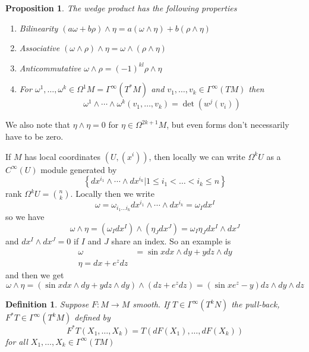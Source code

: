 \documentclass[a4paper]{article}
\newtheorem*{prop}{Proposition}
\newtheorem*{defn}{Definition}
\begin{document}
\begin{prop}
  The wedge product has the following properties
  \begin{enumerate}
    \item Bilinearity $(a \omega + b \rho) \wedge \eta = a(\omega \wedge \eta) + b (\rho \wedge \eta)$
    \item Associative $(\omega \wedge \rho) \wedge \eta = \omega \wedge (\rho \wedge \eta)$
    \item Anticommutative $\omega \wedge \rho = (-1)^{kl} \rho \wedge \eta$
    \item For $\omega^1, \dots, \omega^k \in \Omega^1M = \Gamma^\infty (T^*M)$ and $v_1,\dots,v_k \in \Gamma^\infty(TM)$ then
      \[
        \omega^1 \wedge \cdots \wedge \omega^k(v_1, \dots, v_k) = \det(w^j(v_i))
      \]
  \end{enumerate}
\end{prop}
We also note that $\eta \wedge \eta = 0$ for $\eta \in \Omega^{2k+1}M$, but even forms don't necessarily have to be zero.

If $M$ has local coordinates $(U,(x^i))$, then locally we can write $\Omega^kU$ as a $C^\infty(U)$ module generated by 
\[
  \left\{ dx^{i_1} \wedge \cdots \wedge dx^{i_k} | 1 \leq i_1 < \dots < i_k \leq n\right\}
\]
rank $\Omega^k U = {n\choose k}$. Locally then we write
\[
  \omega = \omega_{i_1 \dots i_k} dx^{i_1} \wedge \cdots \wedge dx^{i_k} = \omega_I dx^I
\]
so we have
\[
  \omega \wedge  \eta = (\omega_I dx^I) \wedge (\eta_J dx^J) = \omega_I \eta_J dx^I \wedge dx^J
\]
and $dx^I \wedge dx^J = 0$ if $I$ and $J$ share an index. So an example is
\[
  \begin{aligned}
    \omega &= \sin x dx \wedge dy + y dz \wedge dy \\
    \eta = dx + e^z dz
  \end{aligned}
\]
and then we get
\[
  \omega \wedge \eta = (\sin x dx \wedge dy + y dz \wedge dy) \wedge (dz + e^zdz) = (\sin x e^z - y) dz \wedge dy \wedge dz
\]

\begin{defn}
  Suppose $F: M \rightarrow M$ smooth. If $T \in \Gamma^\infty(T^kN)$ the pull-back, $F^* T \in \Gamma^\infty(T^kM)$ defined by 
  \[
    F^*T(X_1, \dots, X_k) = T(dF(X_1), \dots, dF(X_k))
  \]
  for all $X_1, \dots, X_k \in \Gamma^\infty(TM)$
\end{defn}
\end{document}
